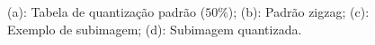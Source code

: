 \begin{figure}[!ht]
\caption{(a): Tabela de quantização padrão ($ 50 \% $); (b): Padrão zigzag; (c): Exemplo de subimagem; (d): Subimagem quantizada.}
\label{comp_visual}
\end{figure}

